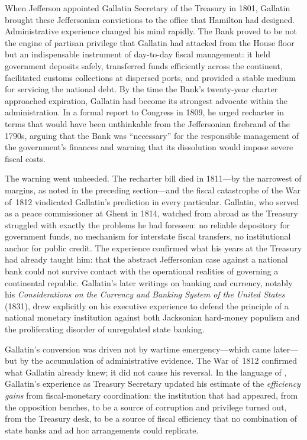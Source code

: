 \documentclass[12pt]{article}
\begin{document}
When Jefferson appointed Gallatin Secretary of the Treasury in 1801,
Gallatin brought these Jeffersonian convictions to the office that
Hamilton had designed.  Administrative experience changed his mind
rapidly.  The Bank proved to be not the engine of partisan privilege
that Gallatin had attacked from the House floor but an indispensable
instrument of day-to-day fiscal management: it held government deposits
safely, transferred funds efficiently across the continent, facilitated
customs collections at dispersed ports, and provided a stable medium for
servicing the national debt.  By the time the Bank's twenty-year charter
approached expiration, Gallatin had become its strongest advocate within
the administration.  In a formal report to Congress in 1809, he urged
recharter in terms that would have been unthinkable from the
Jeffersonian firebrand of the 1790s, arguing that the Bank was
``necessary'' for the responsible management of the government's
finances and warning that its dissolution would impose severe fiscal
costs.

The warning went unheeded.  The recharter bill died in 1811---by the
narrowest of margins, as noted in the preceding section---and the fiscal
catastrophe of the War of~1812 vindicated Gallatin's prediction in every
particular.  Gallatin, who served as a peace commissioner at Ghent in
1814, watched from abroad as the Treasury struggled with exactly the
problems he had foreseen: no reliable depository for government funds,
no mechanism for interstate fiscal transfers, no institutional anchor
for public credit.  The experience confirmed what his years at the
Treasury had already taught him: that the abstract Jeffersonian case
against a national bank could not survive contact with the operational
realities of governing a continental republic.  Gallatin's later
writings on banking and currency, notably his \textit{Considerations on
the Currency and Banking System of the United States} (1831), drew
explicitly on his executive experience to defend the principle of a
national monetary institution against both Jacksonian hard-money
populism and the proliferating disorder of unregulated state banking.

Gallatin's conversion was driven not by wartime emergency---which came
later---but by the accumulation of administrative evidence.
The War of~1812 confirmed what Gallatin already knew; it did not cause
his reversal.  In the language of \citet{Sargent2011}, Gallatin's
experience as Treasury Secretary updated his estimate of the
\emph{efficiency gains} from fiscal-monetary coordination: the
institution that had appeared, from the opposition benches, to be a
source of corruption and privilege turned out, from the Treasury desk,
to be a source of fiscal efficiency that no combination of state banks
and ad hoc arrangements could replicate.
\end{document}
